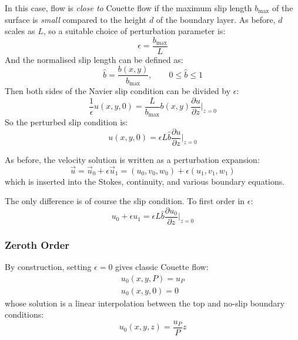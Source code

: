 \documentclass[12pt, a4paper, twoside, openright]{book}
\newcommand{\bmax}{\ensuremath{b_{\mathrm{max}}}}
\begin{document}
In this case, flow is \emph{close to} Couette flow if the maximum slip length $\bmax$ of the surface is \emph{small} compared to the height $d$ of the boundary layer.  As before, $d$ scales as $L$, so a suitable choice of perturbation parameter is:
\begin{equation}
\epsilon = \frac{\bmax}{L}
\end{equation} 
And the normalised slip length can be defined as:
\begin{equation}
\hat{b} = \frac{b(x,y)}{\bmax}, \qquad 0 \leq \hat{b} \leq 1
\end{equation}
Then both sides of the Navier slip condition can be divided by $\epsilon$:
\begin{equation}
\frac{1}{\epsilon} u(x,y,0) = \frac{L}{\bmax} b(x,y) \frac{\partial u}{\partial z} \rvert_{z=0}
\end{equation}
So the perturbed slip condition is:
\begin{equation}
u(x,y,0) = \epsilon L \hat{b} \frac{\partial u}{\partial z} \rvert_{z=0}
\end{equation}

As before, the velocity solution is written as a perturbation expansion:
\begin{equation}
\vec{u} = \vec{u}_0 + \epsilon \vec{u}_1 = (u_0, v_0, w_0) + \epsilon(u_1, v_1, w_1)
\end{equation}
which is inserted into the Stokes, continuity, and various boundary equations.

The only difference is of course the slip condition.  To first order in $\epsilon$:
\begin{equation}
u_0 + \epsilon u_1 = \epsilon L \hat{b} \frac{\partial u_0}{\partial z} \rvert_{z=0}
\end{equation}

\subsubsection*{Zeroth Order}

By construction, setting $\epsilon = 0$ gives classic Couette flow:
\begin{gather}
u_0(x,y,P) = u_P \\
u_0(x,y,0) = 0
\end{gather}
whose solution is a linear interpolation between the top and no-slip boundary conditions:
\begin{equation}
u_0(x,y,z) = \frac{u_P}{P} z
\end{equation}
\end{document}
